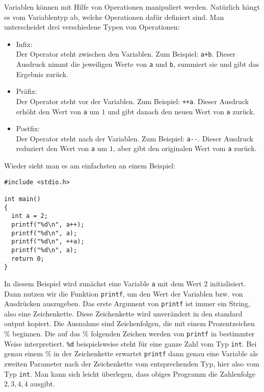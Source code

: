 Variablen können mit Hilfe von Operationen manipuliert werden.
Natürlich hängt es vom Variablentyp ab, welche Operationen dafür definiert sind.
Man unterscheidet drei verschiedene Typen von Operationen:
\begin{itemize}
\item Infix:\\
  Der Operator steht zwischen den Variablen. Zum Beispiel: \verb|a+b|. 
  Dieser Ausdruck nimmt die jeweiligen Werte von \verb|a| und \verb|b|, summiert sie und gibt das Ergebnis zurück.
\item Präfix:\\
  Der Operator steht vor der Variablen. Zum Beispiel: \verb|++a|. 
  Dieser Ausdruck erhöht den Wert von \verb|a| um $1$ und gibt danach den neuen Wert von \verb|a| zurück.
\item Postfix:\\
  Der Operator steht nach der Variablen. Zum Beispiel: \verb|a--|. 
  Dieser Ausdruck reduziert den Wert von \verb|a| um $1$, aber gibt den originalen Wert vom \verb|a| zurück.
\end{itemize}
Wieder sieht man es am einfachsten an einem Beispiel:
\begin{lstlisting}
#include <stdio.h>

int main()
{
  int a = 2;
  printf("%d\n", a++);
  printf("%d\n", a);
  printf("%d\n", ++a);
  printf("%d\n", a);
  return 0;
}
\end{lstlisting}
In diesem Beispiel wird zunächst eine Variable \texttt{a} mit dem Wert $2$ initialisiert.\index{\texttt{++}}
Dann nutzen wir die Funktion \texttt{printf}, um den Wert der Variablen bzw. von Ausdrücken auszugeben. 
Das erste Argument von \texttt{printf} ist immer ein String, also eine Zeichenkette.
Diese Zeichenkette wird unverändert in den standard output kopiert.
Die Ausnahme sind Zeichenfolgen, die mit einem Prozentzeichen \% beginnen.
Die auf das \% folgenden Zeichen werden von \texttt{printf} in bestimmter Weise interpretiert.
\verb|%d| beispielsweise steht für eine ganze Zahl vom Typ \texttt{int}. 
Bei genau einem \% in der Zeichenkette erwartet \texttt{printf} dann genau eine Variable als zweiten Parameter nach der Zeichenkette vom entsprechenden Typ, hier also vom Typ \texttt{int}.
Man kann sich leicht überlegen, dass obiges Programm die Zahlenfolge $2,3,4,4$ ausgibt.

